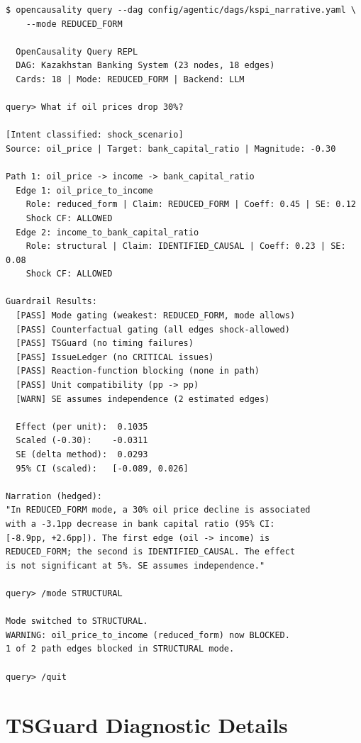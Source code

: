 \documentclass{article}
\begin{document}
\begin{lstlisting}[basicstyle=\ttfamily\scriptsize, breaklines=true, frame=single]
$ opencausality query --dag config/agentic/dags/kspi_narrative.yaml \
    --mode REDUCED_FORM

  OpenCausality Query REPL
  DAG: Kazakhstan Banking System (23 nodes, 18 edges)
  Cards: 18 | Mode: REDUCED_FORM | Backend: LLM

query> What if oil prices drop 30%?

[Intent classified: shock_scenario]
Source: oil_price | Target: bank_capital_ratio | Magnitude: -0.30

Path 1: oil_price -> income -> bank_capital_ratio
  Edge 1: oil_price_to_income
    Role: reduced_form | Claim: REDUCED_FORM | Coeff: 0.45 | SE: 0.12
    Shock CF: ALLOWED
  Edge 2: income_to_bank_capital_ratio
    Role: structural | Claim: IDENTIFIED_CAUSAL | Coeff: 0.23 | SE: 0.08
    Shock CF: ALLOWED

Guardrail Results:
  [PASS] Mode gating (weakest: REDUCED_FORM, mode allows)
  [PASS] Counterfactual gating (all edges shock-allowed)
  [PASS] TSGuard (no timing failures)
  [PASS] IssueLedger (no CRITICAL issues)
  [PASS] Reaction-function blocking (none in path)
  [PASS] Unit compatibility (pp -> pp)
  [WARN] SE assumes independence (2 estimated edges)

  Effect (per unit):  0.1035
  Scaled (-0.30):    -0.0311
  SE (delta method):  0.0293
  95% CI (scaled):   [-0.089, 0.026]

Narration (hedged):
"In REDUCED_FORM mode, a 30% oil price decline is associated
with a -3.1pp decrease in bank capital ratio (95% CI:
[-8.9pp, +2.6pp]). The first edge (oil -> income) is
REDUCED_FORM; the second is IDENTIFIED_CAUSAL. The effect
is not significant at 5%. SE assumes independence."

query> /mode STRUCTURAL

Mode switched to STRUCTURAL.
WARNING: oil_price_to_income (reduced_form) now BLOCKED.
1 of 2 path edges blocked in STRUCTURAL mode.

query> /quit
\end{lstlisting}

\section{TSGuard Diagnostic Details}
\label{app:tsguard}
\end{document}

